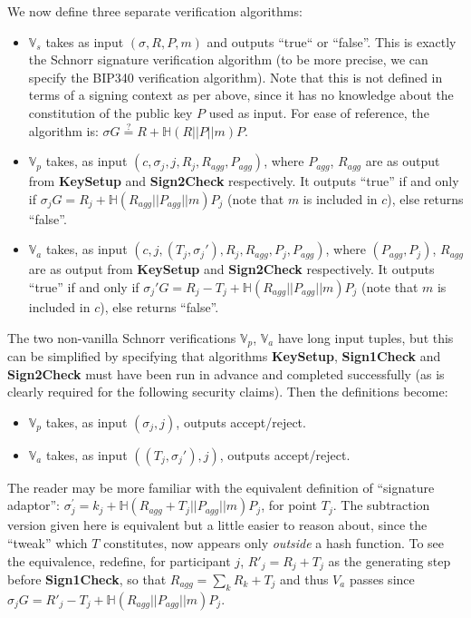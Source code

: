 \documentclass[10pt,a4paper]{article}
\begin{document}
\vspace{5 pt}

We now define three separate verification algorithms:

\begin{itemize}
\item $\mathbb{V}_s$ takes as input $(\sigma, R, P, m)$ and outputs ``true`` or ``false''. This is exactly the Schnorr signature verification algorithm (to be more precise, we can specify the BIP340 verification algorithm). Note that this is not defined in terms of a signing context as per above, since it has no knowledge about the constitution of the public key $P$ used as input. For ease of reference, the algorithm is: $ \sigma G \stackrel{?}{=} R + \mathbb{H}(R || P || m)P$.
\item $\mathbb{V}_p$ takes, as input $(c, \sigma_j, j, R_j, R_{agg}, P_{agg})$, where $P_{agg}$, $R_{agg}$ are as output from \textbf{KeySetup} and \textbf{Sign2Check} respectively. It outputs ``true'' if and only if $\sigma_j G = R_j + \mathbb{H}(R_{agg}||P_{agg}||m)P_j$ (note that $m$ is included in $c$), else returns ``false''.
\item $\mathbb{V}_a$ takes, as input $(c, j, (T_j, \sigma_j'), R_j, R_{agg}, P_j, P_{agg})$, where $(P_{agg}, P_j)$, $R_{agg}$ are as output from \textbf{KeySetup} and \textbf{Sign2Check} respectively. It outputs ``true'' if and only if $\sigma_j' G = R_j - T_j + \mathbb{H}(R_{agg}||P_{agg}||m)P_j$ (note that $m$ is included in $c$), else returns ``false''.
\end{itemize}

The two non-vanilla Schnorr verifications $\mathbb{V}_p$, $\mathbb{V}_a$ have long input tuples, but this can be simplified by specifying that algorithms \textbf{KeySetup}, \textbf{Sign1Check} and \textbf{Sign2Check} must have been run in advance and completed successfully (as is clearly required for the following security claims). Then the definitions become:

\begin{itemize}
\item $\mathbb{V}_p$ takes, as input $(\sigma_j, j)$, outputs accept/reject.
\item $\mathbb{V}_a$ takes, as input $((T_j, \sigma_j'), j)$, outputs accept/reject. 
\end{itemize}

\vspace{5pt}

The reader may be more familiar with the equivalent definition of ``signature adaptor'': $\sigma_j^{'} = k_j + \mathbb{H}(R_{agg} + T_j||P_{agg}||m)P_j$, for point $T_j$. The subtraction version given here is equivalent but a little easier to reason about, since the ``tweak'' which $T$ constitutes, now appears only \emph{outside} a hash function. To see the equivalence, redefine, for participant $j$, $R'_j = R_j + T_j$ as the generating step before \textbf{Sign1Check}, so that $R_{agg} = \sum_k R_k + T_j$ and thus $V_a$ passes since $\sigma_j G = R'_j - T_j + \mathbb{H}(R_{agg}||P_{agg}||m)P_j$.
\end{document}
